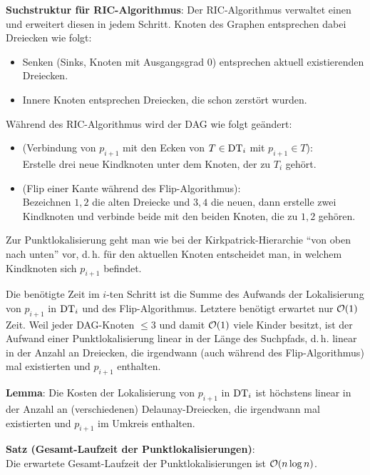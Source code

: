 \textbf{Suchstruktur für RIC-Algorithmus}:
Der RIC-Algorithmus verwaltet einen 
und erweitert diesen in jedem Schritt.
Knoten des Graphen entsprechen dabei Dreiecken wie folgt:
\begin{itemize}
    \item
    Senken (Sinks, Knoten mit Ausgangsgrad $0$) entsprechen aktuell existierenden Dreiecken.

    \item
    Innere Knoten entsprechen Dreiecken, die schon zerstört wurden.
\end{itemize}
Während des RIC-Algorithmus wird der DAG wie folgt geändert:
\begin{itemize}
    \item
    (Verbindung von $p_{i+1}$ mit den Ecken von $T \in \operatorname{DT}_i$ mit $p_{i+1} \in T$):\\
    Erstelle drei neue Kindknoten unter dem Knoten, der zu $T_i$ gehört.

    \item
    (Flip einer Kante während des Flip-Algorithmus):\\
    Bezeichnen $1, 2$ die alten Dreiecke und $3, 4$ die neuen,
    dann erstelle zwei Kindknoten und verbinde beide mit den beiden Knoten, die zu $1, 2$ gehören.
\end{itemize}

Zur Punktlokalisierung geht man wie bei der Kirkpatrick-Hierarchie "`von oben nach unten"' vor,
d.\,h. für den aktuellen Knoten entscheidet man, in welchem Kindknoten sich $p_{i+1}$ befindet.

\linie

Die benötigte Zeit im $i$-ten Schritt ist die Summe des Aufwands der Lokalisierung von $p_{i+1}$
in $\operatorname{DT}_i$ und des Flip-Algorithmus.
Letztere benötigt erwartet nur $\mathcal{O}(1)$ Zeit.
Weil jeder DAG-Knoten $\le 3$ und damit $\mathcal{O}(1)$ viele Kinder besitzt, ist der Aufwand einer
Punktlokalisierung linear in der Länge des Suchpfads, d.\,h. linear in der Anzahl an
Dreiecken, die irgendwann
(auch während des Flip-Algorithmus) mal existierten und $p_{i+1}$ enthalten.

\textbf{Lemma}:
Die Kosten der Lokalisierung von $p_{i+1}$ in $\operatorname{DT}_i$ ist höchstens linear in der Anzahl an
(verschiedenen) Delaunay-Dreiecken, die irgendwann mal existierten und $p_{i+1}$ im Umkreis
enthalten.

\textbf{Satz (Gesamt-Laufzeit der Punktlokalisierungen)}:\\
Die erwartete Gesamt-Laufzeit der Punktlokalisierungen ist $\mathcal{O}(n \log n)$.

